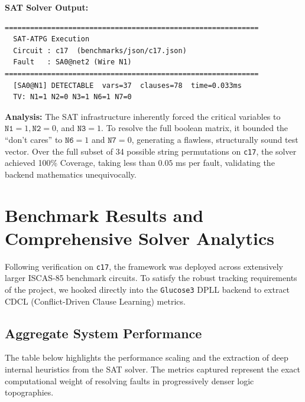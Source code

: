 \documentclass[11pt,a4paper]{article}
\begin{document}
\textbf{SAT Solver Output:}
\begin{verbatim}
============================================================
  SAT-ATPG Execution
  Circuit : c17  (benchmarks/json/c17.json)
  Fault   : SA0@net2 (Wire N1)
============================================================
  [SA0@N1] DETECTABLE  vars=37  clauses=78  time=0.033ms 
  TV: N1=1 N2=0 N3=1 N6=1 N7=0
\end{verbatim}

\textbf{Analysis:} The SAT infrastructure inherently forced the critical variables to $\texttt{N1}=1, \texttt{N2}=0$, and $\texttt{N3}=1$. To resolve the full boolean matrix, it bounded the ``don't cares'' to $\texttt{N6}=1$ and $\texttt{N7}=0$, generating a flawless, structurally sound test vector. Over the full subset of 34 possible string permutations on \texttt{c17}, the solver achieved 100\% Coverage, taking less than $0.05$ ms per fault, validating the backend mathematics unequivocally.

\section{Benchmark Results and Comprehensive Solver Analytics}
Following verification on \texttt{c17}, the framework was deployed across extensively larger ISCAS-85 benchmark circuits. To satisfy the robust tracking requirements of the project, we hooked directly into the \texttt{Glucose3} DPLL backend to extract CDCL (Conflict-Driven Clause Learning) metrics.

\subsection{Aggregate System Performance}
The table below highlights the performance scaling and the extraction of deep internal heuristics from the SAT solver. The metrics captured represent the exact computational weight of resolving faults in progressively denser logic topographies.
\end{document}
